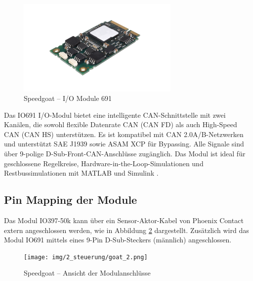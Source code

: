 \begin{figure}[ht]
	\begin{center}
		\includegraphics[width=0.7\textwidth]{img/2_steuerung/goat_io691.png}
		\caption{Speedgoat – I/O Module 691 \cite{speedgoat:IO691}}
		\label{img_2_2:goat:IO691}
	\end{center}
\end{figure}

Das IO691 I/O-Modul bietet eine intelligente CAN-Schnittstelle mit zwei Kanälen, die sowohl flexible Datenrate CAN (CAN FD) als auch High-Speed CAN (CAN HS) unterstützen. Es ist kompatibel mit CAN 2.0A/B-Netzwerken und unterstützt SAE J1939 sowie ASAM XCP für Bypassing. Alle Signale sind über 9-polige D-Sub-Front-CAN-Anschlüsse zugänglich. Das Modul ist ideal für geschlossene Regelkreise, Hardware-in-the-Loop-Simulationen und Restbussimulationen mit MATLAB und Simulink \cite{speedgoat:IO691}.

\subsection{Pin Mapping der Module}
Das Modul IO397-50k kann über ein Sensor-Aktor-Kabel von Phoenix Contact extern angeschlossen werden, wie in Abbildung \ref{img_2_2:steuerung_goat:2} dargestellt.
Zusätzlich wird das Modul IO691 mittels eines 9-Pin D-Sub-Steckers (männlich) angeschlossen.

\begin{figure}[ht]
	\begin{center}
		\texttt{[image: img/2\_steuerung/goat\_2.png]}
		\caption{Speedgoat – Ansicht der Modulanschlüsse}
		\label{img_2_2:steuerung_goat:2}
	\end{center}
\end{figure}




